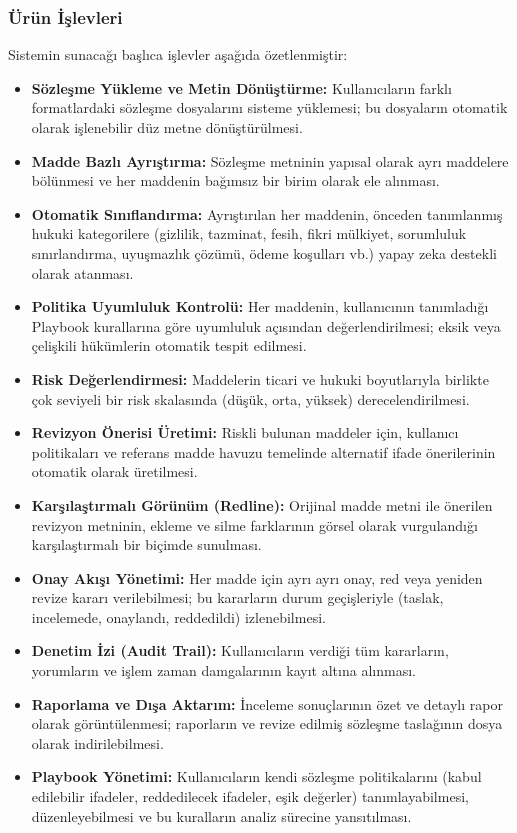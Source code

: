 \documentclass[12pt, a4paper]{article}
\begin{document}
\subsubsection{Ürün İşlevleri}
Sistemin sunacağı başlıca işlevler aşağıda özetlenmiştir:

\begin{itemize}[leftmargin=2cm]
    \item \textbf{Sözleşme Yükleme ve Metin Dönüştürme:} Kullanıcıların farklı formatlardaki sözleşme dosyalarını sisteme yüklemesi; bu dosyaların otomatik olarak işlenebilir düz metne dönüştürülmesi.
    \item \textbf{Madde Bazlı Ayrıştırma:} Sözleşme metninin yapısal olarak ayrı maddelere bölünmesi ve her maddenin bağımsız bir birim olarak ele alınması.
    \item \textbf{Otomatik Sınıflandırma:} Ayrıştırılan her maddenin, önceden tanımlanmış hukuki kategorilere (gizlilik, tazminat, fesih, fikri mülkiyet, sorumluluk sınırlandırma, uyuşmazlık çözümü, ödeme koşulları vb.) yapay zeka destekli olarak atanması.
    \item \textbf{Politika Uyumluluk Kontrolü:} Her maddenin, kullanıcının tanımladığı Playbook kurallarına göre uyumluluk açısından değerlendirilmesi; eksik veya çelişkili hükümlerin otomatik tespit edilmesi.
    \item \textbf{Risk Değerlendirmesi:} Maddelerin ticari ve hukuki boyutlarıyla birlikte çok seviyeli bir risk skalasında (düşük, orta, yüksek) derecelendirilmesi.
    \item \textbf{Revizyon Önerisi Üretimi:} Riskli bulunan maddeler için, kullanıcı politikaları ve referans madde havuzu temelinde alternatif ifade önerilerinin otomatik olarak üretilmesi.
    \item \textbf{Karşılaştırmalı Görünüm (Redline):} Orijinal madde metni ile önerilen revizyon metninin, ekleme ve silme farklarının görsel olarak vurgulandığı karşılaştırmalı bir biçimde sunulması.
    \item \textbf{Onay Akışı Yönetimi:} Her madde için ayrı ayrı onay, red veya yeniden revize kararı verilebilmesi; bu kararların durum geçişleriyle (taslak, incelemede, onaylandı, reddedildi) izlenebilmesi.
    \item \textbf{Denetim İzi (Audit Trail):} Kullanıcıların verdiği tüm kararların, yorumların ve işlem zaman damgalarının kayıt altına alınması.
    \item \textbf{Raporlama ve Dışa Aktarım:} İnceleme sonuçlarının özet ve detaylı rapor olarak görüntülenmesi; raporların ve revize edilmiş sözleşme taslağının dosya olarak indirilebilmesi.
    \item \textbf{Playbook Yönetimi:} Kullanıcıların kendi sözleşme politikalarını (kabul edilebilir ifadeler, reddedilecek ifadeler, eşik değerler) tanımlayabilmesi, düzenleyebilmesi ve bu kuralların analiz sürecine yansıtılması.
\end{itemize}
\end{document}
